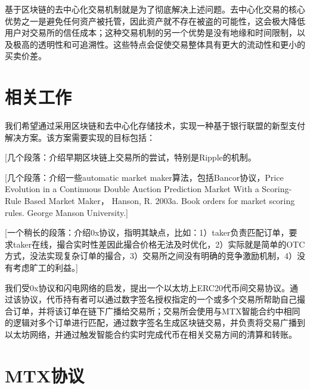 \documentclass[UTF8,nofonts]{ctexart}
\begin{document}
基于区块链的去中心化交易机制就是为了彻底解决上述问题。去中心化交易的核心优势之一是避免任何资产被托管，因此资产就不存在被盗的可能性，这会极大降低用户对交易所的信任成本；这种交易机制的另一个优势是没有地缘和时间限制，以及极高的透明性和可追溯性。这些特点会促使交易整体具有更大的流动性和更小的买卖价差。

\section{相关工作\label{sec:existingworks}}
我们希望通过采用区块链\cite{nakamoto2008bitcoin,swan2015blockchain}和去中心化存储技术，实现一种基于银行联盟的新型支付解决方案。该方案需要实现的目标包括：

[几个段落：介绍早期区块链上交易所的尝试，特别是Ripple的机制。


[几个段落：介绍一些automatic market maker算法，包括Bancor协议，{Price Evolution in a Continuous Double Auction Prediction Market With a Scoring-Rule Based Market Maker}， {Hanson, R. 2003a. Book orders for market scoring rules. George Manson University.}]

[一个稍长的段落：介绍0x协议，指明其缺点，比如：1）taker负责匹配订单，要求taker在线，撮合实时性差因此撮合价格无法及时优化，2）实际就是简单的OTC方式，没法实现复杂订单的撮合，3）交易所之间没有明确的竞争激励机制，4）没有考虑旷工的利益。]

我们受0x协议和闪电网络的启发，提出一个以太坊上ERC20代币间交易协议。通过该协议，代币持有者可以通过数字签名授权指定的一个或多个交易所帮助自己撮合订单，并将该订单在链下广播给交易所；交易所会使用与MTX智能合约中相同的逻辑对多个订单进行匹配，通过数字签名生成区块链交易，并负责将交易广播到以太坊网络，并通过触发智能合约实时完成代币在相关交易方间的清算和转账。

\section{MTX协议\label{sec:protocol}}
\end{document}
